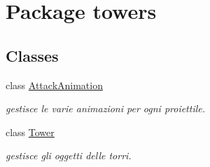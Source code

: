\hypertarget{namespacetowers}{}\section{Package towers}
\label{namespacetowers}
\subsection*{Classes}
\begin{DoxyCompactItemize}
\item 
class \hyperlink{classtowers_1_1_attack_animation}{Attack\+Animation}
\begin{DoxyCompactList}\small\item\em gestisce le varie animazioni per ogni proiettile. \end{DoxyCompactList}\item 
class \hyperlink{classtowers_1_1_tower}{Tower}
\begin{DoxyCompactList}\small\item\em gestisce gli oggetti delle torri. \end{DoxyCompactList}\end{DoxyCompactItemize}
